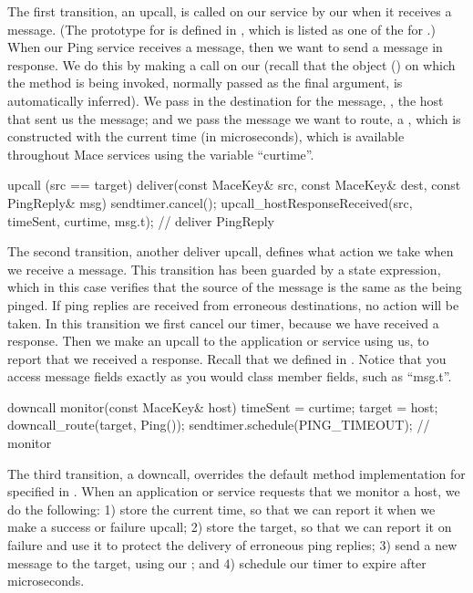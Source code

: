 The first transition, an upcall, is called on our service by our
  when it receives a
 message.  (The prototype for  is defined in
, which is listed as one of the
 for .)  When our Ping service
receives a  message, then we want to send a
 message in response.  We do this by making a
 call on our 
(recall that the object () on which the method is being
invoked, normally passed as the final argument, is automatically inferred).
We pass in the destination for the message, , the host that
sent us the  message; and we pass the message we want to route,
a , which is constructed with the current time (in
microseconds), which is available throughout Mace services using the variable
``curtime''.


\begin{programlisting}
  upcall (src == target) deliver(const MaceKey& src, const MaceKey& dest, const PingReply& msg) {
    sendtimer.cancel();
    upcall_hostResponseReceived(src, timeSent, curtime, msg.t);
  } // deliver PingReply
\end{programlisting}

The second transition, another deliver upcall, defines what action we take
when we receive a  message.  This transition has been
guarded by a state expression, which in this case verifies that the source of
the  message is the same as the 
being pinged.  If ping replies are received from erroneous destinations, no
action will be taken.  In this transition we first cancel our timer, because
we have received a response.  Then we make an upcall to the application or
service using us, to report that we received a response.  Recall that we
defined  in .
Notice that you access message fields exactly as you would class member
fields, such as ``msg.t''.


\begin{programlisting}
  downcall monitor(const MaceKey& host) {
    timeSent = curtime;
    target = host;
    downcall_route(target, Ping());
    sendtimer.schedule(PING_TIMEOUT);
  } // monitor
\end{programlisting}

The third transition, a downcall, overrides the default method
implementation for  specified in
.  When an application or service requests
that we monitor a host, we do the following: 1) store the current
time, so that we can report it when we make a success or failure
upcall; 2) store the target, so that we can report it on failure and use
it to protect the delivery of erroneous ping replies; 3)
send a new  message to the target, using our
 ; and 4) schedule
our timer to expire after  microseconds.


